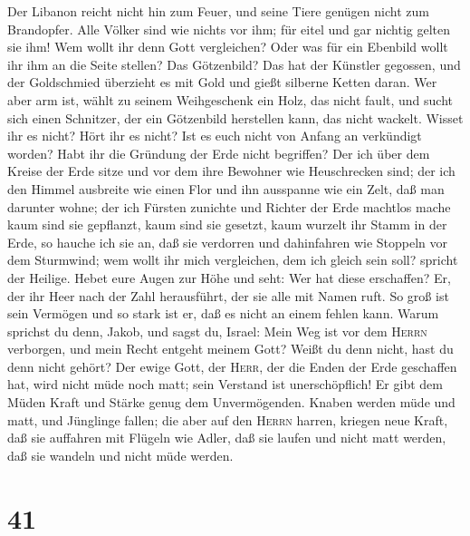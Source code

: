  Der Libanon reicht nicht hin zum Feuer, und seine Tiere
genügen nicht zum Brandopfer.  Alle Völker sind wie
nichts vor ihm; für eitel und gar nichtig gelten sie ihm!
 Wem wollt ihr denn Gott vergleichen? Oder was für ein
Ebenbild wollt ihr ihm an die Seite stellen?  Das
Götzenbild? Das hat der Künstler gegossen, und der Goldschmied überzieht
es mit Gold und gießt silberne Ketten daran.  Wer aber
arm ist, wählt zu seinem Weihgeschenk ein Holz, das nicht fault, und
sucht sich einen Schnitzer, der ein Götzenbild herstellen kann, das
nicht wackelt.  Wisset ihr es nicht? Hört ihr es nicht?
Ist es euch nicht von Anfang an verkündigt worden? Habt ihr die Gründung
der Erde nicht begriffen?  Der ich über dem Kreise der
Erde sitze und vor dem ihre Bewohner wie Heuschrecken sind; der ich den
Himmel ausbreite wie einen Flor und ihn ausspanne wie ein Zelt, daß man
darunter wohne;  der ich Fürsten zunichte und Richter der
Erde machtlos mache  kaum sind sie gepflanzt, kaum sind
sie gesetzt, kaum wurzelt ihr Stamm in der Erde, so hauche ich sie an,
daß sie verdorren und dahinfahren wie Stoppeln vor dem Sturmwind;
 wem wollt ihr mich vergleichen, dem ich gleich sein
soll? spricht der Heilige.  Hebet eure Augen zur Höhe und
seht: Wer hat diese erschaffen? Er, der ihr Heer nach der Zahl
herausführt, der sie alle mit Namen ruft. So groß ist sein Vermögen und
so stark ist er, daß es nicht an einem fehlen kann. 
Warum sprichst du denn, Jakob, und sagst du, Israel: Mein Weg ist vor
dem \textsc{Herrn} verborgen, und mein Recht entgeht meinem Gott?
 Weißt du denn nicht, hast du denn nicht gehört? Der
ewige Gott, der \textsc{Herr}, der die Enden der Erde geschaffen hat,
wird nicht müde noch matt; sein Verstand ist unerschöpflich!
 Er gibt dem Müden Kraft und Stärke genug dem
Unvermögenden.  Knaben werden müde und matt, und
Jünglinge fallen;  die aber auf den \textsc{Herrn}
harren, kriegen neue Kraft, daß sie auffahren mit Flügeln wie Adler, daß
sie laufen und nicht matt werden, daß sie wandeln und nicht müde werden.

\hypertarget{section-40}{%
\section{41}\label{section-40}}


